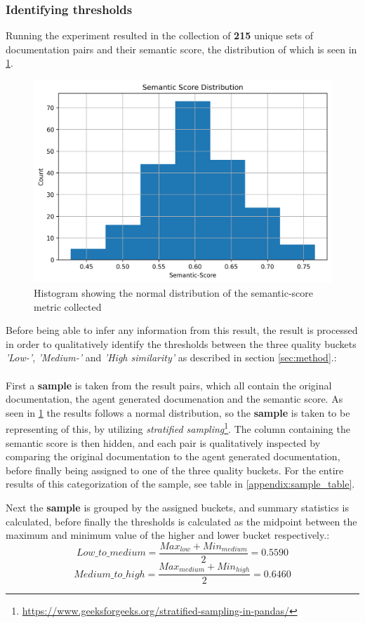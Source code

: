 \subsubsection{Identifying thresholds}
\label{sec:identifying thresholds}
Running the experiment resulted in the collection of \textbf{215} unique sets of documentation pairs and their semantic score, the distribution of which is seen in \cref{fig:sem_hist}.
\begin{figure}[H]
\centering
\includegraphics[width=0.7\linewidth]{Figures/semantic_score_histogram.png}
\caption{Histogram showing the normal distribution of the semantic-score metric collected}
\label{fig:sem_hist}
\end{figure}

Before being able to infer any information from this result, the result is processed in order to qualitatively identify the thresholds between the three quality buckets \textit{'Low-'}, \textit{'Medium-'} and \textit{'High similarity'} as described in section \cref{sec:method}.:
\\\\
First a \textbf{sample} is taken from the result pairs, which all contain the original documentation, the agent generated documenation and the semantic score. As seen in \cref{fig:sem_hist} the results follows a normal distribution, so the \textbf{sample} is taken to be representing of this, by utilizing \textit{stratified sampling}\footnote{\url{https://www.geeksforgeeks.org/stratified-sampling-in-pandas/}}. The column containing the semantic score is then hidden, and each pair is qualitatively inspected by comparing the original documentation to the agent generated documentation, before finally being assigned to one of the three quality buckets. For the entire results of this categorization of the sample, see table in \cref{appendix:sample_table}.

Next the \textbf{sample} is grouped by the assigned buckets, and summary statistics is calculated, before finally the thresholds is calculated as the midpoint between the maximum and minimum value of the higher and lower bucket respectively.:
\[
Low\_to\_medium = \frac{Max_{low}+Min_{medium}}{2} = 0.5590
\]
\[
Medium\_to\_high = \frac{Max_{medium}+Min_{high}}{2} = 0.6460
\]

